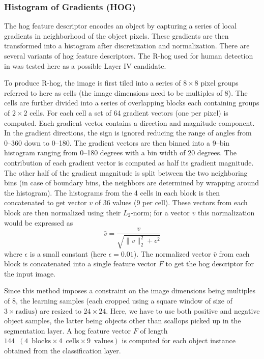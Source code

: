 \documentclass {udthesis}
\begin{document}
\subsubsection{Histogram of Gradients (HOG)}
The \gls{hog} feature descriptor encodes an object by capturing a series of local gradients in neighborhood of the object pixels. 
These gradients are then transformed into a histogram after discretization and normalization. 
There are several variants of \gls{hog} feature descriptors. 
The \textsc{R-}\gls{hog} used for human detection in \cite{dalal} was tested here as a possible Layer IV candidate.

To produce \textsc{R-}\gls{hog}, the image is first tiled into a series of $8\times8$ pixel groups referred to here as cells (the image dimensions need to be multiples of 8). 
The cells are further divided into a series of overlapping blocks each containing groups of $2\times2$ cells. 
For each cell a set of 64 gradient vectors (one per pixel) is computed. 
Each gradient vector contains a direction and magnitude component. 
In the gradient directions, the sign is ignored reducing the range of angles from 0--360 down to 0--180. 
The gradient vectors are then binned into a 9--bin histogram ranging from 0--180 degrees with a bin width of 20 degrees. 
The contribution of each gradient vector is computed as half its gradient magnitude. 
The other half of the gradient magnitude is split between the two neighboring bins (in case of boundary bins, the neighbors are determined by wrapping around the histogram). 
The histograms from the 4 cells in each block is then concatenated to get vector $v$ of $36$ values ($9$ per cell). 
These vectors from each block are then normalized using their $L_2$-norm; for a vector $v$ this normalization would be expressed as
\[
 \bar{v}=\frac{v}{\sqrt{\|v\|^2_2+\epsilon^2}}
\]
where $\epsilon$ is a small constant (here $\epsilon=0.01$). 
The normalized vector $\bar{v}$ from each block is concatenated into a single feature vector $F$ to get the \gls{hog} descriptor for the input image. 
%

Since this method imposes a constraint on the image dimensions being multiples of 8, the learning samples (each cropped using a square window of size of $3\times \text{radius}$) are resized to $24\times24$. 
Here, we have to use both positive and negative object samples, the latter being objects other than scallops picked up in the segmentation layer. 
A \gls{hog} feature vector $F$ of length $144\enspace (4\enspace \text{blocks} \times4\enspace \text{cells} \times9\enspace \text{values})$ is computed for each object instance obtained from the classification layer.
\end{document}

